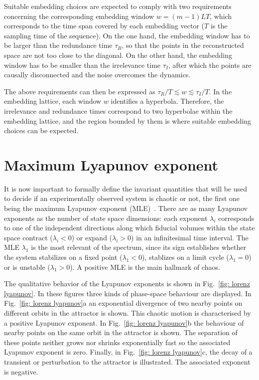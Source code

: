 Suitable embedding choices are expected to comply with two requirements concerning the
corresponding embedding window $w=(m-1)LT$, which corresponds to the
time span covered by each embedding vector ($T$ is the sampling time of the sequence).
On the one hand, the embedding window has to be larger than the redundance time $\tau_R$, so that
the points in the reconstructed space are not too close to the diagonal.
On the other hand, the embedding window has to be
smaller than the irrelevance time $\tau_I$, after which the points are causally disconnected
and the noise overcomes the dynamics.

The above requirements can then be expressed as $\tau_R/T \lesssim w \lesssim \tau_I/T$.
In the embedding lattice, each window $w$ identifies a hyperbola.
Therefore, the irrelevance and redundance times correspond to two hyperbolae
within the embedding lattice, and the region bounded by them is where suitable
embedding choices can be expected.


\section{Maximum Lyapunov exponent}\label{sec: mle}

It is now important to formally define the invariant
quantities that will be used to decide if an experimentally observed system is chaotic or not,
the first one being the maximum Lyapunov
exponent (MLE)~\cite{ref:abarbanel_fourier_spectra,wolf1986quantifying}.
There are as many Lyapunov exponents as the number of state space dimensions: each exponent $\lambda_i$
corresponds to one of the independent directions along which fiducial volumes within the state space
contract ($\lambda_i<0$) or expand ($\lambda_i>0$) in an infinitesimal time interval.
The MLE $\lambda_1$ is the most relevant of the spectrum, since its sign establishes whether the system
stabilizes on a fixed point ($\lambda_1<0$), stablizes on a limit cycle ($\lambda_1=0$) or is unstable
($\lambda_1>0$). A positive MLE is the main hallmark of chaos.

The qualitative behavior of the Lyapunov exponents is shown in Fig.~\ref{fig: lorenz lyapunov}.
In these figures three kinds of phase-space behaviour are displayed.
In Fig.~\ref{fig: lorenz lyapunov}a an exponential divergence
of two nearby points on different orbits in the attractor is shown.
This chaotic motion is
characterised by a positive Lyapunov exponent. In Fig.~\ref{fig: lorenz lyapunov}b the
behaviour of nearby points on the same orbit in the attractor is shown. The
separation of these points neither grows nor shrinks exponentially fast so
the associated Lyapunov exponent is zero. Finally, in Fig.~\ref{fig: lorenz lyapunov}c, the
decay of a transient or perturbation to the attractor is illustrated.
The associated exponent is negative.

